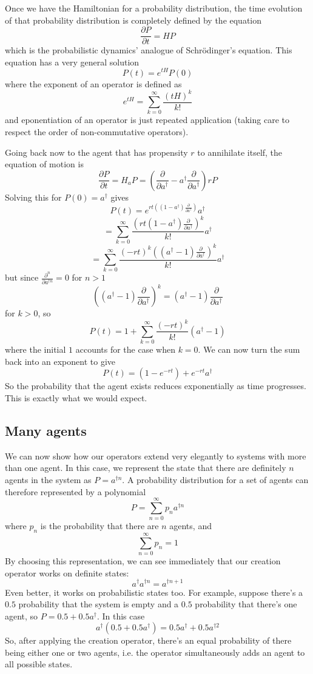 \documentclass[letterpaper,twocolumn,10pt]{article}
\begin{document}
Once we have the Hamiltonian for a probability distribution, the time evolution of that probability distribution is completely defined by the equation
\[
\frac{\partial P}{\partial t} = HP
\]
which is the probabilistic dynamics' analogue of Schr\"{o}dinger's equation. This equation has a very general solution
\[
P(t) = e^{tH}P(0)
\]
where the exponent of an operator is defined as
\[
e^{tH} = \sum_{k=0}^\infty \frac{(tH)^k}{k!}
\]
and eponentiation of an operator is just repeated application (taking care to respect the order of non-commutative operators).

Going back now to the agent that has propensity $r$ to annihilate itself, the equation of motion is
\[
\frac{\partial P}{\partial t} = H_aP = \left(\frac{\partial }{\partial a^\dag} - a^\dag\frac{\partial }{\partial a^\dag}\right)rP
\]
Solving this for $P(0) = a^\dag$ gives
\[
P(t) = e^{rt((1-a^\dag)\frac{\partial}{\partial a^\dag})}a^\dag
\]
\[
 = \sum_{k=0}^\infty \frac{\left(rt(1-a^\dag)\frac{\partial}{\partial a^\dag}\right)^k}{k!}a^\dag
\]
\[
= \sum_{k=0}^\infty \frac{(-rt)^k\left((a^\dag-1)\frac{\partial}{\partial a^\dag}\right)^k}{k!}a^\dag
\]
but since $\frac{\partial^n}{\partial a^{\dag n}} = 0$ for $n>1$
\[
\left((a^\dag-1)\frac{\partial}{\partial a^\dag}\right)^k = (a^\dag-1)\frac{\partial}{\partial a^\dag}
\]
for $k>0$, so
\[
P(t) = 1 + \sum_{k=0}^\infty \frac{(-rt)^k}{k!}(a^\dag-1)
\]
where the initial $1$ accounts for the case when $k=0$. We can now turn the sum back into an exponent to give
\[
P(t) = (1 - e^{-rt}) + e^{-rt}a^\dag
\]
So the probability that the agent exists reduces exponentially as time progresses. This is exactly what we would expect.

\subsection{Many agents}

We can now show how our operators extend very elegantly to systems with more than one agent. In this case, we represent the state that there are definitely $n$ agents in the system as $P = a^{\dag n}$. A probability distribution for a set of agents can therefore represented by a polynomial
\[
P = \sum_{n=0}^\infty p_n a^{\dag n}
\]
where $p_n$ is the probability that there are $n$ agents, and
\[
\sum_{n=0}^\infty p_n = 1
\]
By choosing this representation, we can see immediately that our creation operator works on definite states:
\[
a^\dag a^{\dag n} = a^{\dag n+1}
\]
Even better, it works on probabilistic states too. For example, suppose there's a $0.5$ probability that the system is empty and a $0.5$ probability that there's one agent, so $P = 0.5 + 0.5a^\dag$. In this case
\[
a^\dag (0.5 + 0.5a^\dag) = 0.5a^\dag + 0.5a^{\dag 2}
\]
So, after applying the creation operator, there's an equal probability of there being either one or two agents, i.e. the operator simultaneously adds an agent to all possible states.
\end{document}

